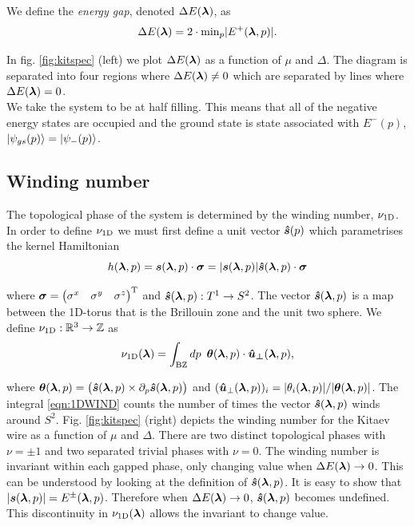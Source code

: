 \noi We define the \emph{energy gap}, denoted $\Delta E(\boldsymbol{\lambda})$, as 
\begin{equation}
    \Delta E(\boldsymbol{\lambda})=2\cdot\text{min}_{p}|E^{+}(\boldsymbol{\lambda},p)|.
\end{equation}

\noi In fig. \ref{fig:kitspec} (left) we plot $\Delta E(\boldsymbol{\lambda})$ as a function of $\mu$ and $\Delta$. The diagram is separated into four regions where $\Delta E(\boldsymbol{\lambda})\neq0$ which are separated by lines where $\Delta E(\boldsymbol{\lambda})=0$.\\

We take the system to be at half filling. This means that all of the negative energy states are occupied and the ground state is state associated with $E^{-}(p)$, $\ket{\psi_{gs}(p)}=\ket{\psi_{-}(p)}$. 

\subsection{Winding number}

The topological phase of the system is determined by the winding number, $\nu_{\text{1D}}$. In order to define $\nu_{\text{1D}}$ we must first define a unit vector $\boldsymbol{\hat{s}}(p)$ which parametrises the kernel Hamiltonian
\begin{equation}
    h(\boldsymbol{\lambda},p) = \boldsymbol{s}(\boldsymbol{\lambda},p)\cdot\boldsymbol{\sigma}=|\boldsymbol{s}(\boldsymbol{\lambda},p)|\boldsymbol{\hat{s}}(\boldsymbol{\lambda},p)\cdot\boldsymbol{\sigma}
\end{equation}

\noi where $\boldsymbol{\sigma}=\begin{pmatrix} \sigma^{x} & \sigma^{y} & \sigma^{z} \end{pmatrix}^{\text{T}}$ and $\boldsymbol{\hat{s}}(\boldsymbol{\lambda},p):T^{1}\rightarrow S^{2}$. The vector $\boldsymbol{\hat{s}}(\boldsymbol{\lambda},p)$ is a map between the 1D-torus that is the Brillouin zone and the unit two sphere. We define $\nu_{\text{1D}}:\mathbb{R}^{3}\rightarrow \mathbb{Z}$ as 
\begin{equation}\label{eqn:1DWIND}
    \nu_{\text{1D}}(\boldsymbol{\lambda}) = \int_{\text{BZ}} dp \,\,\, \boldsymbol{\theta}(\boldsymbol{\lambda},p) \cdot\boldsymbol{\hat{u}_{\perp}}(\boldsymbol{\lambda},p),
\end{equation}

\noi where $\boldsymbol{\theta}(\boldsymbol{\lambda},p)=\big(\boldsymbol{\hat{s}}(\boldsymbol{\lambda},p)\times\partial_{p}\boldsymbol{\hat{s}}(\boldsymbol{\lambda},p)\big)$ and $(\boldsymbol{\hat{u}}_{\perp}(\boldsymbol{\lambda},p))_{i}=|\theta_{i}(\boldsymbol{\lambda},p)|/|\boldsymbol{\theta}(\boldsymbol{\lambda},p)|$. The integral \eqref{eqn:1DWIND} counts the number of times the vector $\boldsymbol{\hat{s}}(\boldsymbol{\lambda},p)$ winds around $S^{2}$. Fig. \ref{fig:kitspec} (right) depicts the winding number for the Kitaev wire as a function of $\mu$ and $\Delta$. There are two distinct topological phases with $\nu=\pm1$ and two separated trivial phases with $\nu=0$. The winding number is invariant within each gapped phase, only changing value when $\Delta E(\boldsymbol{\lambda})\rightarrow0$. This can be understood by looking at the definition of $\boldsymbol{\hat{s}}(\boldsymbol{\lambda},p)$. It is easy to show that $|\boldsymbol{s}(\boldsymbol{\lambda},p)|=E^{\pm}(\boldsymbol{\lambda},p)$. Therefore when $\Delta E(\boldsymbol{\lambda})\rightarrow0$, $\boldsymbol{\hat{s}}(\boldsymbol{\lambda},p)$ becomes undefined. This discontinuity in $\nu_{\text{1D}}(\boldsymbol{\lambda})$ allows the invariant to change value.\\

